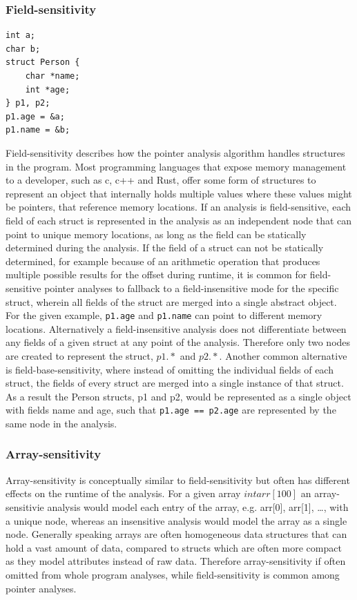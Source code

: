 \subsubsection{Field-sensitivity}
\begin{verbatim}
int a;
char b;
struct Person {
    char *name;
    int *age;
} p1, p2;
p1.age = &a;
p1.name = &b;
\end{verbatim}

Field-sensitivity describes how the pointer analysis algorithm handles structures in the program.
Most programming languages that expose memory management to a developer, such as c, c++ and Rust, offer some form of structures to represent an object that internally holds multiple values where these values might be pointers, that reference memory locations.
If an analysis is field-sensitive, each field of each struct is represented in the analysis as an independent node that can point to unique memory locations, as long as the field can be statically determined during the analysis.
If the field of a struct can not be statically determined, for example because of an arithmetic operation that produces multiple possible results for the offset during runtime, it is common for field-sensitive pointer analyses to fallback to a field-insensitive mode for the specific struct, wherein all fields of the struct are merged into a single abstract object.
For the given example, \verb|p1.age| and \verb|p1.name| can point to different memory locations.
Alternatively a field-insensitive analysis does not differentiate between any fields of a given struct at any point of the analysis.
Therefore only two nodes are created to represent the struct, $p1.*$ and $p2.*$.
Another common alternative is field-base-sensitivity, where instead of omitting the individual fields of each struct, the fields of every struct are merged into a single instance of that struct.
As a result the Person structs, p1 and p2, would be represented as a single object with fields name and age, such that \verb|p1.age == p2.age| are represented by the same node in the analysis.

\subsubsection{Array-sensitivity}
Array-sensitivity is conceptually similar to field-sensitivity but often has different effects on the runtime of the analysis.
For a given array $int arr[100]$ an array-sensitivie analysis would model each entry of the array, \newline e.g. arr[0], arr[1], \dots, with a unique node, whereas an insensitive analysis would model the array as a single node.
Generally speaking arrays are often homogeneous data structures that can hold a vast amount of data, compared to structs which are often more compact as they model attributes instead of raw data.
Therefore array-sensitivity if often omitted from whole program analyses, while field-sensitivity is common among pointer analyses.

